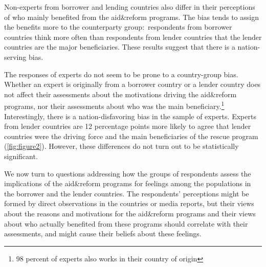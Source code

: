 Non-experts from borrower and lending countries also differ in
their perceptions of who mainly benefited from the aid\&reform programs. The
bias tends to assign the benefits more to the counterparty group:\
respondents from borrower countries think more often than respondents from
lender countries that the lender countries are the major beneficiaries. These results
suggest that there is a nation-serving bias. 

The responses of experts do not seem to be prone to a country-group
bias. Whether an expert is originally from a borrower country or a lender
country does not affect their assessments about the
motivations driving the aid\&reform programs, nor their assessments about
who was the main beneficiary.\footnote{98 percent of experts also works in their country of origin }  Interestingly, there is a nation-disfavoring bias in the sample of experts. Experts from lender countries are 12 percentage points more likely to agree that lender countries were the driving force and the main beneficiaries of the rescue program (\autoref{fig:figure2}). However, these differences do not turn out to be statistically significant.

We now turn to questions addressing how the groups of respondents
assess the implications of the aid\&reform programs for feelings among the
populations in the borrower and the lender
countries. The respondents' perceptions might be formed by direct
observations in the countries or media reports, but their views about the
reasons and motivations for the aid\&reform programs and their views about
who actually benefited from these programs should correlate with their
assessments, and might cause their beliefs about these feelings. 

